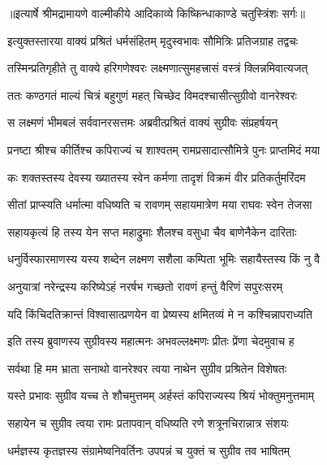 {॥इत्यार्षे श्रीमद्रामायणे वाल्मीकीये आदिकाव्ये किष्किन्धाकाण्डे चतुस्त्रिंशः सर्गः॥}


\twolineshloka
{इत्युक्तस्तारया वाक्यं प्रश्रितं धर्मसंहितम्}
{मृदुस्वभावः सौमित्रिः प्रतिजग्राह तद्वचः} %

\twolineshloka
{तस्मिन्प्रतिगृहीते तु वाक्ये हरिगणेश्वरः}
{लक्ष्मणात्सुमहत्त्रासं वस्त्रं क्लिन्नमिवात्यजत्} %

\twolineshloka
{ततः कण्ठगतं माल्यं चित्रं बहुगुणं महत्}
{चिच्छेद विमदश्चासीत्सुग्रीवो वानरेश्वरः} %

\twolineshloka
{स लक्ष्मणं भीमबलं सर्ववानरसत्तमः}
{अब्रवीत्प्रश्रितं वाक्यं सुग्रीवः संप्रहर्षयन्} %

\twolineshloka
{प्रनष्टा श्रीश्च कीर्तिश्च कपिराज्यं च शाश्वतम्}
{रामप्रसादात्सौमित्रे पुनः प्राप्तमिदं मया} %

\twolineshloka
{कः शक्तस्तस्य देवस्य ख्यातस्य स्वेन कर्मणा}
{तादृशं विक्रमं वीर प्रतिकर्तुमरिंदम} %

\twolineshloka
{सीतां प्राप्स्यति धर्मात्मा वधिष्यति च रावणम्}
{सहायमात्रेण मया राघवः स्वेन तेजसा} %

\twolineshloka
{सहायकृत्यं हि तस्य येन सप्त महाद्रुमाः}
{शैलश्च वसुधा चैव बाणेनैकेन दारिताः} %

\twolineshloka
{धनुर्विस्फारमाणस्य यस्य शब्देन लक्ष्मण}
{सशैला कम्पिता भूमिः सहायैस्तस्य किं नु वै} %

\twolineshloka
{अनुयात्रां नरेन्द्रस्य करिष्येऽहं नरर्षभ}
{गच्छतो रावणं हन्तुं वैरिणं सपुरःसरम्} %

\twolineshloka
{यदि किंचिदतिक्रान्तं विश्वासात्प्रणयेन वा}
{प्रेष्यस्य क्षमितव्यं मे न कश्चिन्नापराध्यति} %

\twolineshloka
{इति तस्य ब्रुवाणस्य सुग्रीवस्य महात्मनः}
{अभवल्लक्ष्मणः प्रीतः प्रेंणा चेदमुवाच ह} %

\twolineshloka
{सर्वथा हि मम भ्राता सनाथो वानरेश्वर}
{त्वया नाथेन सुग्रीव प्रश्रितेन विशेषतः} %

\twolineshloka
{यस्ते प्रभावः सुग्रीव यच्च ते शौचमुत्तमम्}
{अर्हस्तं कपिराज्यस्य श्रियं भोक्तुमनुत्तमाम्} %

\twolineshloka
{सहायेन च सुग्रीव त्वया रामः प्रतापवान्}
{वधिष्यति रणे शत्रूनचिरान्नात्र संशयः} %

\twolineshloka
{धर्मज्ञस्य कृतज्ञस्य संग्रामेष्वनिवर्तिनः}
{उपपन्नं च युक्तं च सुग्रीव तव भाषितम्} %

